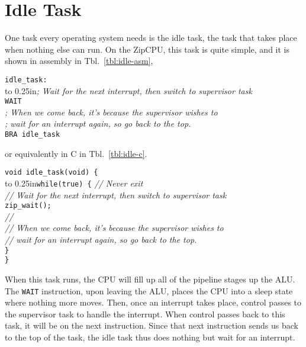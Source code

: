 \documentclass{gqtekspec}
\begin{document}
\section{Idle Task}
One task every operating system needs is the idle task, the task that takes
place when nothing else can run.  On the ZipCPU, this task is quite simple,
and it is shown in assembly in Tbl.~\ref{tbl:idle-asm},
\begin{table}\begin{center}
\begin{tabbing}
{\tt idle\_task:} \\
\hbox to 0.25in{}\= {\em ; Wait for the next interrupt, then switch to supervisor task} \\
\>        {\tt WAIT} \\
\>        {\em ; When we come back, it's because the supervisor wishes to} \\
\>        {\em ; wait for an interrupt again, so go back to the top.} \\
\>        {\tt BRA idle\_task} \\
\end{tabbing}
\caption{Example Idle Task in Assembly}\label{tbl:idle-asm}
\end{center}\end{table}
or equivalently in C in Tbl.~\ref{tbl:idle-c}.
\begin{table}\begin{center}
\begin{tabbing}
{\tt void idle\_task(void) \{} \\
\hbox to 0.25in{}\={\tt while(true) \{} {\em // Never exit}\\
\> {\em // Wait for the next interrupt, then switch to supervisor task} \\

\> {\tt zip\_wait();} \\
\> {\em // } \\
\> {\em // When we come back, it's because the supervisor wishes to} \\
\> {\em // wait for an interrupt again, so go back to the top.} \\
\> {\tt \}} \\
{\tt \}}
\end{tabbing}
\caption{Example Idle Task in C}\label{tbl:idle-c}
\end{center}\end{table}

When this task runs, the CPU will fill up all of the pipeline stages up the
ALU.  The {\tt WAIT} instruction, upon leaving the ALU, places the CPU into
a sleep state where nothing more moves.  Then, once an interrupt takes place,
control passes to the supervisor task to handle the interrupt.  When control
passes back to this task, it will be on the next instruction.  Since that next
instruction sends us back to the top of the task, the idle task thus does
nothing but wait for an interrupt.
\end{document}
